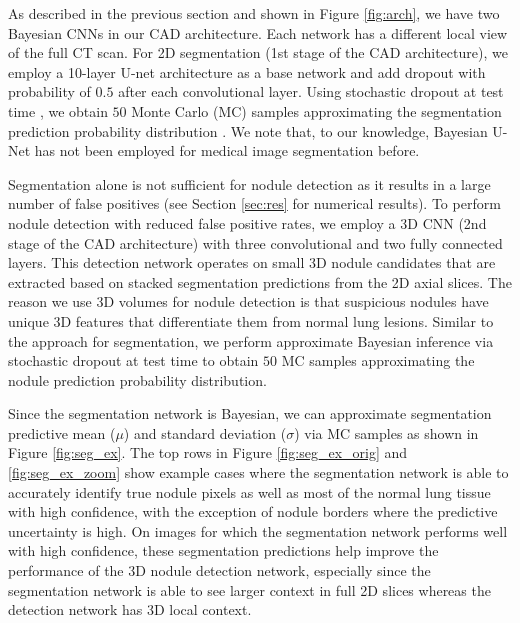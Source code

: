 \documentclass{article}
\begin{document}

As described in the previous section and shown in Figure \ref{fig:arch}, we have two Bayesian CNNs in our CAD architecture. Each network has a different local view of the full CT scan. 
For 2D segmentation (1st stage of the CAD architecture), we employ a 10-layer U-net architecture \cite{unet_miccai15} as a base network and add dropout with probability of $0.5$ after each convolutional layer. Using stochastic dropout at test time \cite{gal_icml16, gal_iclr16}, we obtain $50$ Monte Carlo (MC) samples approximating the segmentation prediction probability distribution \cite{Kendall2015BayesianSM}. We note that, to our knowledge, Bayesian U-Net has not been employed for medical image segmentation before.

Segmentation alone is not sufficient for nodule detection as it results in a large number of false positives (see Section \ref{sec:res} for numerical results). To perform nodule detection with reduced false positive rates, we employ a 3D CNN (2nd stage of the CAD architecture) with three convolutional and two fully connected layers. This detection network operates on small 3D nodule candidates that are extracted based on stacked segmentation predictions from the 2D axial slices. The reason we use 3D volumes for nodule detection is that suspicious nodules have unique 3D features that differentiate them from normal lung lesions. Similar to the approach for segmentation, we perform approximate Bayesian inference via stochastic dropout at test time to obtain $50$ MC samples approximating the nodule prediction probability distribution. 

Since the segmentation network is Bayesian, we can approximate segmentation predictive mean ($\mu$) and standard deviation ($\sigma$) via MC samples as shown in Figure \ref{fig:seg_ex}. The top rows in Figure \ref{fig:seg_ex_orig} and \ref{fig:seg_ex_zoom} show example cases where the segmentation network is able to accurately identify true nodule pixels as well as most of the normal lung tissue with high confidence, with the exception of nodule borders where the predictive uncertainty is high. 
On images for which the segmentation network performs well with high confidence, these segmentation predictions help improve the performance of the 3D nodule detection network, especially since the segmentation network is able to see larger context in full 2D slices whereas the detection network has 3D local context. 
\end{document}
